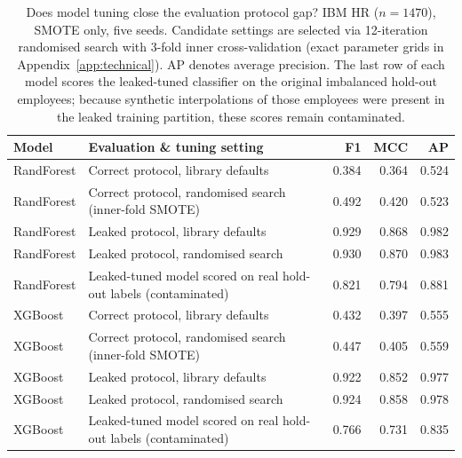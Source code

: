 \documentclass[12pt,a4paper]{article}
\begin{document}
\begin{table}[p]
\centering\singlespacing\small\setlength{\tabcolsep}{3pt}
\caption{Does model tuning close the evaluation protocol gap? IBM HR ($n=1470$), SMOTE only, five seeds. Candidate settings are selected via 12-iteration randomised search with 3-fold inner cross-validation (exact parameter grids in Appendix~\ref{app:technical}). AP denotes average precision. The last row of each model scores the leaked-tuned classifier on the original imbalanced hold-out employees; because synthetic interpolations of those employees were present in the leaked training partition, these scores remain contaminated.}
\label{tab:4}
\small\begin{tabularx}{\textwidth}{@{}lXrrr@{}}
\toprule
\textbf{Model} & \textbf{Evaluation \& tuning setting} & \textbf{F1} & \textbf{MCC} & \textbf{AP} \\
\midrule
RandForest & Correct protocol, library defaults & 0.384 & 0.364 & 0.524 \\
RandForest & Correct protocol, randomised search (inner-fold SMOTE) & 0.492 & 0.420 & 0.523 \\
RandForest & Leaked protocol, library defaults & 0.929 & 0.868 & 0.982 \\
RandForest & Leaked protocol, randomised search & 0.930 & 0.870 & 0.983 \\
RandForest & Leaked-tuned model scored on real hold-out labels (contaminated) & 0.821 & 0.794 & 0.881 \\
\midrule
XGBoost & Correct protocol, library defaults & 0.432 & 0.397 & 0.555 \\
XGBoost & Correct protocol, randomised search (inner-fold SMOTE) & 0.447 & 0.405 & 0.559 \\
XGBoost & Leaked protocol, library defaults & 0.922 & 0.852 & 0.977 \\
XGBoost & Leaked protocol, randomised search & 0.924 & 0.858 & 0.978 \\
XGBoost & Leaked-tuned model scored on real hold-out labels (contaminated) & 0.766 & 0.731 & 0.835 \\
\bottomrule
\end{tabularx}
\end{table}
\clearpage
\end{document}
